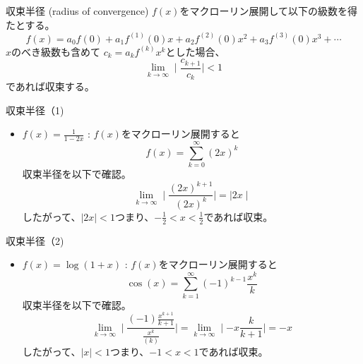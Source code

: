 \begin{slide}{収束半径 (radius of convergence)}
$f(x)$をマクローリン展開して以下の級数を得たとする。
\begin{equation}
f(x) = a_0 f(0) + a_1 f^{(1)}(0) x + a_2 f^{(2)}(0) x^2 + a_3 f^{(3)}(0)x^3 + \cdots
\end{equation}
$x$のべき級数も含めて $c_k = a_k f^{(k)} x^k$とした場合、
\begin{equation}
\lim_{k \to \infty}  \mid \frac{c_{k+1}}{c_k} \mid  < 1
\end{equation}
であれば収束する。

\end{slide}

\begin{slide}{収束半径（1)}
\begin{itemize}
\item $f(x) = \frac{1}{1-2x}$ : 
$f(x)$をマクローリン展開すると
\begin{equation}
f(x) = \sum_{k=0}^\infty (2x)^k 
\end{equation}
収束半径を以下で確認。
\begin{equation}
\lim_{k \to \infty} \mid \frac{(2x)^{k+1}}{(2x)^k} \mid = \mid 2x  \mid 
\end{equation}
したがって、$\mid 2x \mid < 1$つまり、$-\frac{1}{2} < x < \frac{1}{2}$であれば収束。


\end{itemize}
\end{slide}
%
%
%

\begin{slide}{収束半径（2)}
\begin{itemize}
\item $f(x) = \log(1+x)$ : 
$f(x)$をマクローリン展開すると
\begin{equation}
\cos(x) = \sum_{k=1}^{\infty}(-1)^{k-1}\frac{x^{k}}{k}
\end{equation}
収束半径を以下で確認。
\begin{equation}
\lim_{k \to \infty} \mid \frac{(-1)\frac{x^{k+1}}{k+1}}{\frac{x^{k}}{(k)}} \mid = \lim_{k\to \infty}\mid-x \frac{k}{k+1}  \mid = -x 
\end{equation}
したがって、$\mid x \mid < 1$つまり、$-1< x < 1 $であれば収束。
\end{itemize}
\end{slide}

